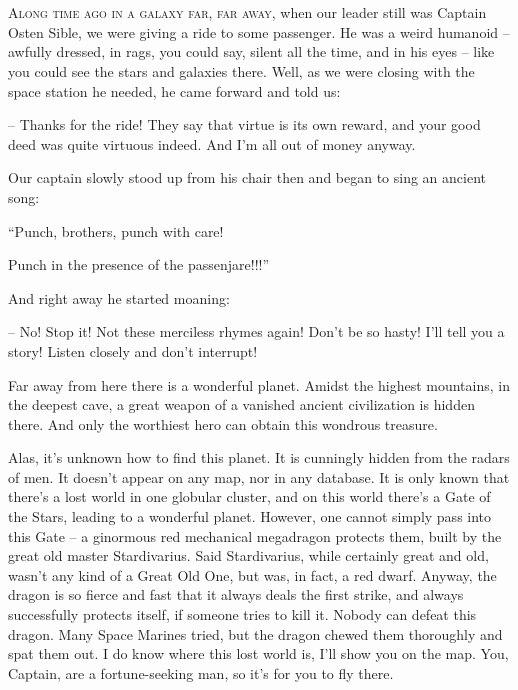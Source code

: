 \documentclass[ebook,twoside,final,openright]{memoir}
\begin{document}
\chapter{}
\par
\lettrine{A}{long time ago in a galaxy far, far away,} when our leader still was Captain Osten Sible, we were giving a ride to some passenger. He was a weird humanoid – awfully dressed, in rags, you could say, silent all the time, and in his eyes – like you could see the stars and galaxies there. Well, as we were closing with the space station he needed, he came forward and told us: \par
\par
– Thanks for the ride! They say that virtue is its own reward, and your good deed was quite virtuous indeed. And I’m all out of money anyway.\par
Our captain slowly stood up from his chair then and began to sing an ancient song: \par
“Punch, brothers, punch with care! \par
 Punch in the presence of the passenjare!!!” \par
And right away he started moaning: \par
 – No! Stop it! Not these merciless rhymes again! Don’t be so hasty! I'll tell you a story! Listen closely and don’t interrupt!\par
\par
Far away from here there is a wonderful planet. Amidst the highest mountains, in the deepest cave, a great weapon of a vanished ancient civilization is hidden there. And only the worthiest hero can obtain this wondrous treasure. \par
Alas, it’s unknown how to find this planet. It is cunningly hidden from the radars of men. It doesn’t appear on any map, nor in any database. It is only known that there’s a lost world in one globular cluster, and on this world there’s a Gate of the Stars, leading to a wonderful planet. However, one cannot simply pass into this Gate – a ginormous red mechanical megadragon protects them, built by the great old master Stardivarius. Said Stardivarius, while certainly great and old, wasn’t any kind of a Great Old One, but was, in fact, a red dwarf. Anyway, the dragon is so fierce and fast that it always deals the first strike, and always successfully protects itself, if someone tries to kill it. Nobody can defeat this dragon. Many Space Marines tried, but the dragon chewed them thoroughly and spat them out. I do know where this lost world is, I'll show you on the map. You, Captain, are a fortune-seeking man, so it’s for you to fly there.\par
\end{document}
